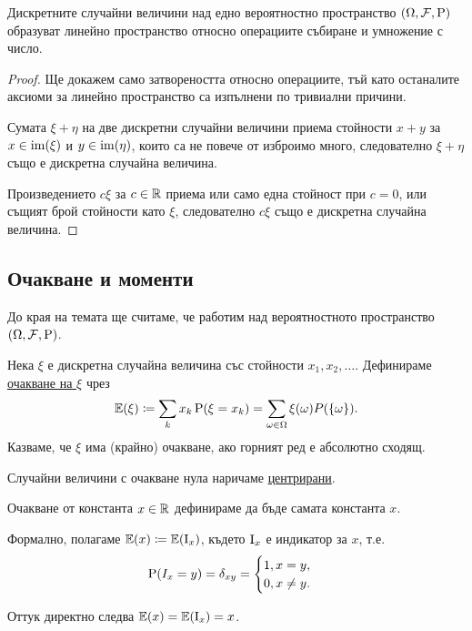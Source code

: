 \documentclass[numbers=endperiod, DIV=15, bibliography=totocnumbered]{scrartcl}
\begin{document}
\begin{proposition}
  Дискретните случайни величини над едно вероятностно пространство $(\Omega, \mathcal{F}, \operatorname{P})$ образуват линейно пространство относно операциите събиране и умножение с число.
\end{proposition}
\begin{proof}
  Ще докажем само затвореността относно операциите, тъй като останалите аксиоми за линейно пространство са изпълнени по тривиални причини.

  Сумата $\xi + \eta$ на две дискретни случайни величини приема стойности $x + y$ за $x \in \operatorname{im}(\xi)$ и $y \in \operatorname{im}(\eta)$, които са не повече от изброимо много, следователно $\xi + \eta$ също е дискретна случайна величина.

  Произведението $c \xi$ за $c \in \mathbb{R}$ приема или само една стойност при $c = 0$, или същият брой стойности като $\xi$, следователно $c \xi$ също е дискретна случайна величина.
\end{proof}

\subsection{Очакване и моменти}

До края на темата ще считаме, че работим над вероятностното пространство $(\Omega, \mathcal{F}, \operatorname{P})$.

\begin{definition}
  Нека $\xi$ е дискретна случайна величина със стойности $x_1, x_2, \ldots$. Дефинираме \underline{очакване на $\xi$} чрез
  \begin{displaymath}
    \mathbb{E}(\xi) \coloneqq \sum_k x_k \operatorname{P}(\xi = x_k) = \sum_{\omega \in \Omega} \xi(\omega) P(\{ \omega \}).
  \end{displaymath}
  Казваме, че $\xi$ има (крайно) очакване, ако горният ред е абсолютно сходящ.

  Случайни величини с очакване нула наричаме \underline{центрирани}.

  Очакване от константа $x \in \mathbb{R}$ дефинираме да бъде самата константа $x$.
\end{definition}

\begin{note}
  Формално, полагаме $\mathbb{E}(x) \coloneqq \mathbb{E}(\operatorname{I}_x)$, където $\operatorname{I}_x$ е индикатор за $x$, т.е.
  \begin{displaymath}
    \operatorname{P}(I_x = y) = \delta_{xy} = \begin{cases}
      1, x = y, \\
      0, x \neq y.
    \end{cases}
  \end{displaymath}

  Оттук директно следва $\mathbb{E}(x) = \mathbb{E}(\operatorname{I}_x) = x$.
\end{note}
\end{document}
